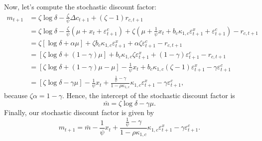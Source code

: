 Now, let's compute the stochastic discount factor:
$$
	\begin{aligned}
		m_{t+1} &= \zeta \log \delta - \frac{\zeta}{\psi} \Delta c_{t+1}+ (\zeta-1) r_{c,t+1}\\
		&= \zeta \log \delta -  \frac{\zeta}{\psi}\left(\mu + x_{t} 
		+ \varepsilon_{t+1}^c\right) + \zeta \left(\mu + \frac{1}{\psi}x_t + b_c \kappa_{1,c} \varepsilon_{t+1}^x + \varepsilon_{t+1}^c\right) - r_{c,t+1}\\
		&= \zeta\left[\log\delta + \alpha\mu\right] + \zeta b_c \kappa_{1,c} \varepsilon_{t+1}^x + \alpha\zeta \varepsilon_{t+1}^c- r_{c,t+1}\\
		&= \left[\zeta \log \delta + (1-\gamma)\mu \right] +  b_c \kappa_{1,c}\zeta\varepsilon_{t+1}^x + (1-\gamma)\varepsilon_{t+1}^c- r_{c,t+1}\\
		&= \left[\zeta\log\delta + (1-\gamma)\mu - \mu\right] -\frac{1}{\psi}x_t + b_c \kappa_{1,c}(\zeta-1)\varepsilon_{t+1}^x - \gamma\varepsilon_{t+1}^c\\
		&= \left[\zeta\log \delta - \gamma\mu\right] - \frac{1}{\psi}x_t + \frac{\frac{1}{\psi}-\gamma}{1-\rho\kappa_{1,c}}\kappa_{1,c}\varepsilon_{t+1}^x - \gamma\varepsilon_{t+1}^c,
	\end{aligned}
$$
because $\zeta \alpha = 1-\gamma$. Hence, the intercept of the stochastic discount factor is
\begin{equation}\label{eq:mbar}
	\bar{m} = \zeta\log\delta-\gamma\mu.
\end{equation}
Finally, our stochastic discount factor is given by
\begin{equation}\label{eq:sdf}
	m_{t+1} = \bar{m} - \frac{1}{\psi}x_t + \frac{\frac{1}{\psi}-\gamma}{1-\rho\kappa_{1,c}}\kappa_{1,c}\varepsilon_{t+1}^x - \gamma\varepsilon_{t+1}^c.
\end{equation}